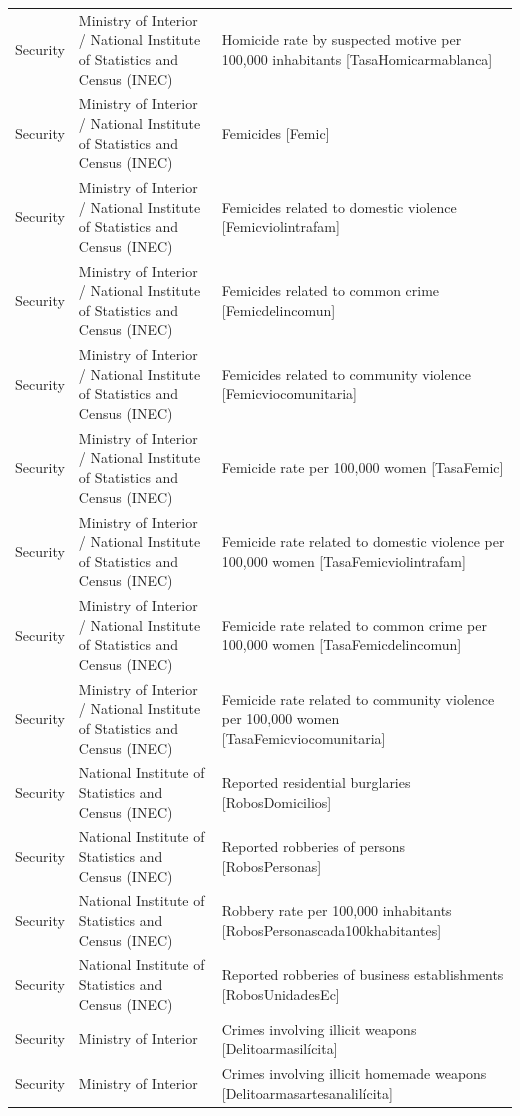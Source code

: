 \begin{landscape}
\begin{longtable}[t]{>{\raggedright\arraybackslash}p{3.4cm}>{\raggedright\arraybackslash}p{5.6cm}>{\raggedright\arraybackslash}p{12.4cm}}
Security & Ministry of Interior / National Institute of Statistics and Census (INEC) & Homicide rate by suspected motive per 100,000 inhabitants [TasaHomicarmablanca]\\
Security & Ministry of Interior / National Institute of Statistics and Census (INEC) & Femicides [Femic]\\
Security & Ministry of Interior / National Institute of Statistics and Census (INEC) & Femicides related to domestic violence [Femicviolintrafam]\\
Security & Ministry of Interior / National Institute of Statistics and Census (INEC) & Femicides related to common crime [Femicdelincomun]\\
Security & Ministry of Interior / National Institute of Statistics and Census (INEC) & Femicides related to community violence [Femicviocomunitaria]\\
Security & Ministry of Interior / National Institute of Statistics and Census (INEC) & Femicide rate per 100,000 women [TasaFemic]\\
Security & Ministry of Interior / National Institute of Statistics and Census (INEC) & Femicide rate related to domestic violence per 100,000 women [TasaFemicviolintrafam]\\
Security & Ministry of Interior / National Institute of Statistics and Census (INEC) & Femicide rate related to common crime per 100,000 women [TasaFemicdelincomun]\\
Security & Ministry of Interior / National Institute of Statistics and Census (INEC) & Femicide rate related to community violence per 100,000 women [TasaFemicviocomunitari\allowbreak{}a]\\
Security & National Institute of Statistics and Census (INEC) & Reported residential burglaries [RobosDomicilios]\\
Security & National Institute of Statistics and Census (INEC) & Reported robberies of persons [RobosPersonas]\\
Security & National Institute of Statistics and Census (INEC) & Robbery rate per 100,000 inhabitants [RobosPersonascada100kh\allowbreak{}abitantes]\\
Security & National Institute of Statistics and Census (INEC) & Reported robberies of business establishments [RobosUnidadesEc]\\
Security & Ministry of Interior & Crimes involving illicit weapons [Delitoarmasilícita]\\
Security & Ministry of Interior & Crimes involving illicit homemade weapons [Delitoarmasartesanalil\allowbreak{}ícita]\\

\end{longtable}
\end{landscape}
